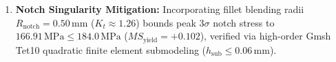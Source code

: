 \begin{svgraybox}
\begin{enumerate}
\item \textbf{Notch Singularity Mitigation:} Incorporating fillet blending radii $R_{\text{notch}} = 0.50\,\text{mm}$ ($K_t \approx 1.26$) bounds peak $3\sigma$ notch stress to $166.91\,\text{MPa} \le 184.0\,\text{MPa}$ ($MS_{\text{yield}} = +0.102$), verified via high-order Gmsh Tet10 quadratic finite element submodeling ($h_{\text{sub}} \le 0.06\,\text{mm}$).
\end{enumerate}
\end{svgraybox}
